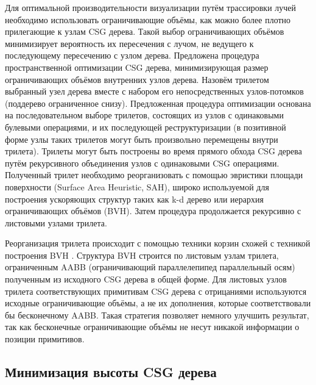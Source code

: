 Для оптимальной производительности визуализации путём трассировки лучей необходимо использовать ограничивающие объёмы, как можно более плотно прилегающие к узлам CSG дерева. Такой выбор ограничивающих объёмов минимизирует вероятность их пересечения с лучом, не ведущего к последующему пересечению с узлом дерева. Предложена процедура пространственной оптимизации CSG дерева, минимизирующая размер ограничивающих объёмов внутренних узлов дерева. Назовём трилетом выбранный узел дерева вместе с набором его непосредственных узлов-потомков (поддерево ограниченное снизу). Предложенная процедура оптимизации основана на последовательном выборе трилетов, состоящих из узлов с одинаковыми булевыми операциями,  и их последующей реструктуризации (в позитивной форме узлы таких трилетов могут быть произвольно перемещены внутри трилета). Трилеты могут быть построены во время прямого обхода CSG дерева путём рекурсивного объединения узлов с одинаковыми CSG операциями. Полученный трилет необходимо реорганизовать с помощью эвристики площади поверхности (Surface Area Heuristic, SAH), широко используемой для построения ускоряющих структур таких как k-d дерево или иерархия ограничивающих объёмов (BVH). Затем процедура продолжается рекурсивно с листовыми узлами трилета.

Реорганизация трилета происходит с помощью техники корзин схожей с техникой построения BVH . Структура BVH строится по листовым узлам трилета, ограниченным AABB (ограничивающий параллелепипед параллельный осям) полученным из исходного CSG дерева в общей форме. Для листовых узлов трилета соответствующих примитивам CSG дерева с отрицаниями используются исходные ограничивающие объёмы, а не их дополнения, которые соответствовали бы бесконечному AABB. Такая стратегия позволяет немного улучшить результат, так как бесконечные ограничивающие объёмы не несут никакой информации о позиции примитивов.

\subsection{Минимизация высоты CSG дерева} \label{sect2_height_minimization}

